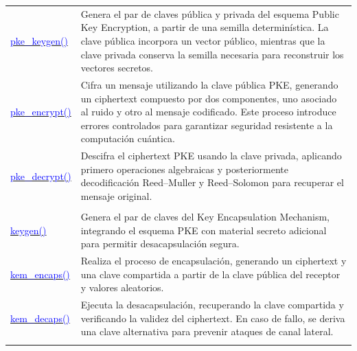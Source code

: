 \begin{longtable}{|>{\centering\arraybackslash}m{4.7cm}|>{\arraybackslash}m{11.9cm}|}
 \\
\hline
\multicolumn{2}{|c|}{\textbf{Esquema PKE}} \\
\hline
\href{https://github.com/camilo-home/hqc128/blob/30e4dd2663a1562349b38cff338aa3e4845d5bf5/hqc128.py#L315}{\textcolor{blue}{pke\_keygen()}} &
Genera el par de claves pública y privada del esquema Public Key Encryption, a partir de una semilla determinística. La clave pública incorpora un vector público, mientras que la clave privada conserva la semilla necesaria para reconstruir los vectores secretos.
 \\
\hline
\href{https://github.com/camilo-home/hqc128/blob/30e4dd2663a1562349b38cff338aa3e4845d5bf5/hqc128.py#L344}{\textcolor{blue}{pke\_encrypt()}} &
Cifra un mensaje utilizando la clave pública PKE, generando un ciphertext compuesto por dos componentes, uno asociado al ruido y otro al mensaje codificado. Este proceso introduce errores controlados para garantizar seguridad resistente a la computación cuántica.
 \\
\hline
\href{https://github.com/camilo-home/hqc128/blob/30e4dd2663a1562349b38cff338aa3e4845d5bf5/hqc128.py#L380}{\textcolor{blue}{pke\_decrypt()}} &
Descifra el ciphertext PKE usando la clave privada, aplicando primero operaciones algebraicas y posteriormente decodificación Reed–Muller y Reed–Solomon para recuperar el mensaje original.
 \\
\hline
\multicolumn{2}{|c|}{\textbf{Esquema KEM}} \\
\hline
\href{https://github.com/camilo-home/hqc128/blob/30e4dd2663a1562349b38cff338aa3e4845d5bf5/hqc128.py#L332}{\textcolor{blue}{keygen()}} &
Genera el par de claves del Key Encapsulation Mechanism, integrando el esquema PKE con material secreto adicional para permitir desacapsulación segura.
 \\
\hline
\href{https://github.com/camilo-home/hqc128/blob/30e4dd2663a1562349b38cff338aa3e4845d5bf5/hqc128.py#L366}{\textcolor{blue}{kem\_encaps()}} &
Realiza el proceso de encapsulación, generando un ciphertext y una clave compartida a partir de la clave pública del receptor y valores aleatorios.
 \\
\hline
\href{https://github.com/camilo-home/hqc128/blob/30e4dd2663a1562349b38cff338aa3e4845d5bf5/hqc128.py#L394}{\textcolor{blue}{kem\_decaps()}} &
Ejecuta la desacapsulación, recuperando la clave compartida y verificando la validez del ciphertext. En caso de fallo, se deriva una clave alternativa para prevenir ataques de canal lateral.
 \\
\hline
\multicolumn{2}{|c|}{\textbf{Funciónes de prueba}} \\

\end{longtable}
